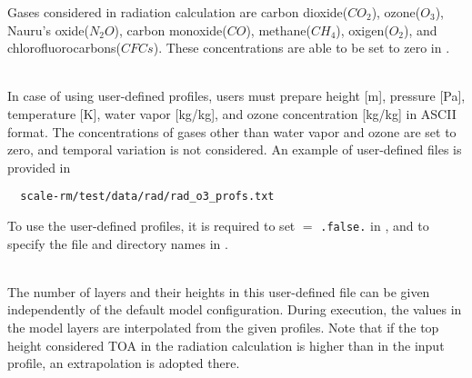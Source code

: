 Gases considered in radiation calculation are carbon dioxide($CO_{2}$), ozone($O_{3}$), Nauru's oxide($N_{2}O$), carbon monoxide($CO$), methane($CH_{4}$), oxigen($O_{2}$), and chlorofluorocarbons($CFCs$). These concentrations are able to be set to zero in .

\\

In case of using user-defined profiles, users must prepare height [m], pressure [Pa], temperature [K], water vapor [kg/kg], and ozone concentration [kg/kg] in ASCII format. The concentrations of gases other than water vapor and ozone are set to zero, and temporal variation is not considered.
An example of user-defined files is provided in
\begin{verbatim}
  scale-rm/test/data/rad/rad_o3_profs.txt
\end{verbatim}
To use the user-defined profiles,
it is required to set  $=$ \verb|.false.| in ,
and to specify the file and directory names in .

\\

The number of layers and their heights in this user-defined file can be given independently of the default model configuration. During execution, the values in the model layers are interpolated from the given profiles. Note that if the top height considered TOA in the radiation calculation is higher than in the input profile, an extrapolation is adopted there.





